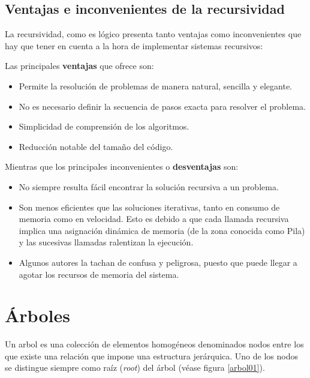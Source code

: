 \documentclass[a4paper, 11pt, titlepage]{article}
\begin{document}
    \subsection{Ventajas e inconvenientes de la recursividad}

        La recursividad, como es lógico presenta tanto ventajas como inconvenientes que hay que 
        tener en cuenta a la hora de implementar sistemas recursivos:

        Las principales \textbf{ventajas} que ofrece son:

        \begin{itemize}
            \item Permite la resolución de problemas de manera natural, sencilla y elegante.
            \item No es necesario definir la secuencia de pasos exacta para resolver el problema.
            \item Simplicidad de comprensión de los algoritmos.
            \item Reducción notable del tamaño del código.
        \end{itemize}

        Mientras que los principales inconvenientes o \textbf{desventajas} son:

        \begin{itemize}
            \item No siempre resulta fácil encontrar la solución recursiva a un problema.
            \item Son menos eficientes que las soluciones iterativas, tanto en consumo de memoria 
            como en velocidad. Esto es debido a que cada llamada recursiva implica una asignación 
            dinámica de memoria (de la zona conocida como Pila) y las sucesivas llamadas ralentizan 
            la ejecución.
            \item Algunos autores la tachan de confusa y peligrosa, puesto que puede llegar a agotar 
            los recursos de memoria del sistema.
        \end{itemize}

\section{Árboles}

    Un arbol es una colección de elementos homogéneos denominados nodos entre los que 
    existe una relación que impone una estructura jerárquica. Uno de los nodos se distingue
    siempre como raíz (\textit{root}) del árbol (véase figura \ref{arbol01}).
\end{document}
